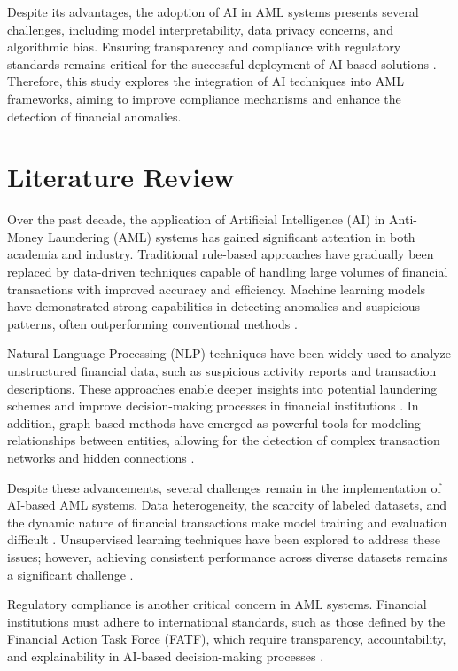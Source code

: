 \documentclass[twoside,twocolumn,10pt]{article}
\begin{document}
Despite its advantages, the adoption of AI in AML systems presents several challenges, including model interpretability, data privacy concerns, and algorithmic bias. Ensuring transparency and compliance with regulatory standards remains critical for the successful deployment of AI-based solutions \cite{ref16}. Therefore, this study explores the integration of AI techniques into AML frameworks, aiming to improve compliance mechanisms and enhance the detection of financial anomalies.

\section{Literature Review}
\fontsize{11}{13}\selectfont

Over the past decade, the application of Artificial Intelligence (AI) in Anti-Money Laundering (AML) systems has gained significant attention in both academia and industry. Traditional rule-based approaches have gradually been replaced by data-driven techniques capable of handling large volumes of financial transactions with improved accuracy and efficiency. Machine learning models have demonstrated strong capabilities in detecting anomalies and suspicious patterns, often outperforming conventional methods \cite{ref9}.

Natural Language Processing (NLP) techniques have been widely used to analyze unstructured financial data, such as suspicious activity reports and transaction descriptions. These approaches enable deeper insights into potential laundering schemes and improve decision-making processes in financial institutions \cite{ref10}. In addition, graph-based methods have emerged as powerful tools for modeling relationships between entities, allowing for the detection of complex transaction networks and hidden connections \cite{ref11}.

Despite these advancements, several challenges remain in the implementation of AI-based AML systems. Data heterogeneity, the scarcity of labeled datasets, and the dynamic nature of financial transactions make model training and evaluation difficult \cite{ref13}. Unsupervised learning techniques have been explored to address these issues; however, achieving consistent performance across diverse datasets remains a significant challenge \cite{ref14}.

Regulatory compliance is another critical concern in AML systems. Financial institutions must adhere to international standards, such as those defined by the Financial Action Task Force (FATF), which require transparency, accountability, and explainability in AI-based decision-making processes \cite{ref17, ref21}.
\end{document}
